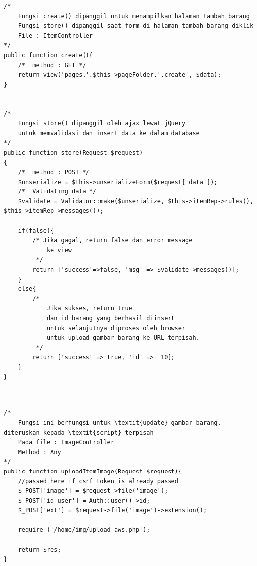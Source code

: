  \begin{lstlisting}[label=cdbe.03-01,style=php,caption=Kode Sumber \textit{Back-end} Mendaftarkan Barang untuk Dilelang]
/*
    Fungsi create() dipanggil untuk menampilkan halaman tambah barang
    Fungsi store() dipanggil saat form di halaman tambah barang diklik
    File : ItemController
*/
public function create(){
    /*  method : GET */
    return view('pages.'.$this->pageFolder.'.create', $data);
}


/*
    Fungsi store() dipanggil oleh ajax lewat jQuery
    untuk memvalidasi dan insert data ke dalam database
*/
public function store(Request $request)
{
    /*  method : POST */
    $unserialize = $this->unserializeForm($request['data']);
    /*  Validating data */
    $validate = Validator::make($unserialize, $this->itemRep->rules(), $this->itemRep->messages());

    if(false){
        /* Jika gagal, return false dan error message 
            ke view
         */
        return ['success'=>false, 'msg' => $validate->messages()];
    }
    else{
        /* 
            Jika sukses, return true 
            dan id barang yang berhasil diinsert
            untuk selanjutnya diproses oleh browser
            untuk upload gambar barang ke URL terpisah.
         */
        return ['success' => true, 'id' =>  10];
    }
}
	  
	  
\end{lstlisting}

\begin{lstlisting}[label=cdjq.03-01,style=php,caption=Kode Sumber \textit{Back-end} Mendaftarkan Barang untuk Dilelang]
/*	
    Fungsi ini berfungsi untuk \textit{update} gambar barang, diteruskan kepada \textit{script} terpisah 
    Pada file : ImageController
    Method : Any
*/
public function uploadItemImage(Request $request){
    //passed here if csrf token is already passed
    $_POST['image'] = $request->file('image');
    $_POST['id_user'] = Auth::user()->id;
    $_POST['ext'] = $request->file('image')->extension();
    
    require ('/home/img/upload-aws.php');

    return $res;
}
\end{lstlisting}


